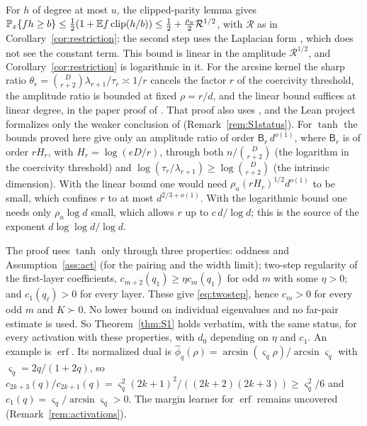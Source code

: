 \begin{remark}\label{rem:loglinear}
For $h$ of degree at most $u$, the clipped-parity lemma
\cite[Lemma~6.1]{subcritical} gives
$\mathbb P_x\{fh\ge b\}\le\frac12(1+\mathbb E f\operatorname{clip}(h/b))\le\frac12+\frac{\rho_u}2
\mathcal R^{1/2}$, with $\mathcal R$ as in Corollary~\ref{cor:restriction};
the second step uses the Laplacian form \cite[eq.~(23)]{subcritical}, which
does not see the constant term. This bound is linear in the amplitude $\mathcal R^{1/2}$, and
Corollary~\ref{cor:restriction} is logarithmic in it. For the arcsine kernel
the sharp ratio $\theta_r=\binom D{r+2}\lambda_{r+1}/\tau_r\asymp1/r$
\cite[Lemma~3.2]{subcritical} cancels the factor $r$ of the coercivity
threshold, the amplitude ratio is bounded at fixed $\rho=r/d$, and the
linear bound suffices at linear degree, in the paper proof of
\cite[Theorem~10.2]{subcritical}. That proof also uses
\cite[Lemma~4.4]{subcritical}, and the Lean project formalizes only the
weaker conclusion of \cite[Theorem~1.1]{subcritical}
(Remark~\ref{rem:S1status}).
For $\tanh$ the bounds proved here give only an amplitude ratio of order
$\mathsf B_r\,d^{o(1)}$, where $\mathsf B_r$ is of order $rH_r$, with
$H_r=\log(eD/r)$, through both $n/\binom D{r+2}$ (the logarithm in the
coercivity threshold) and $\log(\tau_r/\lambda_{r+1})\ge\log\binom D{r+2}$
(the intrinsic dimension). With the linear bound one would need
$\rho_u(rH_r)^{1/2}d^{o(1)}$ to be small, which confines $r$ to at most
$d^{2/3+o(1)}$. With the logarithmic bound one needs only $\rho_u\log d$ small,
which allows $r$ up to $c\,d/\log d$; this is the source of the exponent
$d\log\log d/\log d$.
\end{remark}

\begin{remark}\label{rem:S1act}
The proof uses $\tanh$ only through three properties: oddness and
Assumption~\ref{ass:act} (for the pairing and the width limit); two-step
regularity of the first-layer coefficients, $c_{m+2}(q_1)\ge\eta c_m(q_1)$
for odd $m$ with some $\eta>0$; and $c_1(q_\ell)>0$ for every layer. These
give \eqref{eq:twostep}, hence $c_m>0$ for every odd $m$ and $K\succ0$. No
lower bound on individual eigenvalues and no far-pair estimate is used. So
Theorem~\ref{thm:S1} holds verbatim, with the same status, for every
activation with these properties, with $d_0$ depending on $\eta$ and $c_1$.
An example is $\operatorname{erf}$. Its normalized dual is
$\widehat\phi_q(\rho)=\arcsin(\varsigma_q\rho)/\arcsin\varsigma_q$ with
$\varsigma_q=2q/(1+2q)$, so
$c_{2k+3}(q)/c_{2k+1}(q)=\varsigma_q^2(2k+1)^2/((2k+2)(2k+3))
\ge\varsigma_q^2/6$ and $c_1(q)=\varsigma_q/\arcsin\varsigma_q>0$. The margin learner for
$\operatorname{erf}$ remains uncovered (Remark~\ref{rem:activations}).
\end{remark}

